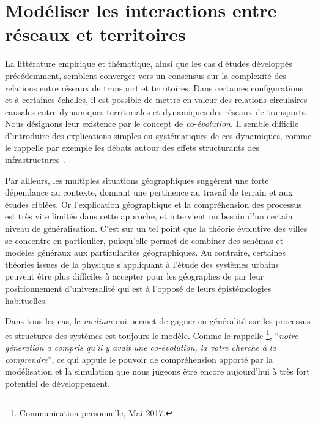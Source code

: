 

\chapter{Modéliser les interactions entre réseaux et territoires}


\label{ch:modelinginteractions}





La littérature empirique et thématique, ainsi que les cas d'études développés précédemment, semblent converger vers un consensus sur la complexité des relations entre réseaux de transport et territoires. Dans certaines configurations et à certaines échelles, il est possible de mettre en valeur des relations circulaires causales entre dynamiques territoriales et dynamiques des réseaux de transports. Nous désignons leur existence par le concept de \emph{co-évolution}. Il semble difficile d'introduire des explications simples ou systématiques de ces dynamiques, comme le rappelle par exemple les débats autour des effets structurants des infrastructures~\cite{offner1993effets}.


Par ailleurs, les multiples situations géographiques suggèrent une forte dépendance au contexte, donnant une pertinence au travail de terrain et aux études ciblées. Or l'explication géographique et la compréhension des processus est très vite limitée dans cette approche, et intervient un besoin d'un certain niveau de généralisation. C'est sur un tel point que la théorie évolutive des villes se concentre en particulier, puisqu'elle permet de combiner des schémas et modèles généraux aux particularités géographiques. Au contraire, certaines théories issues de la physique s'appliquant à l'étude des systèmes urbains~\cite{west2017scale} peuvent être plus difficiles à accepter pour les géographes de par leur positionnement d'universalité qui est à l'opposé de leurs épistémologies habituelles.


Dans tous les cas, le \emph{medium} qui permet de gagner en généralité sur les processus et structures des systèmes est toujours le modèle. Comme le rappelle \footnote{Communication personnelle, Mai 2017.}, ``\textit{notre génération a compris qu'il y avait une co-évolution, la votre cherche à la comprendre}'', ce qui appuie le pouvoir de compréhension apporté par la modélisation et la simulation que nous jugeons être encore aujourd'hui à très fort potentiel de développement.

